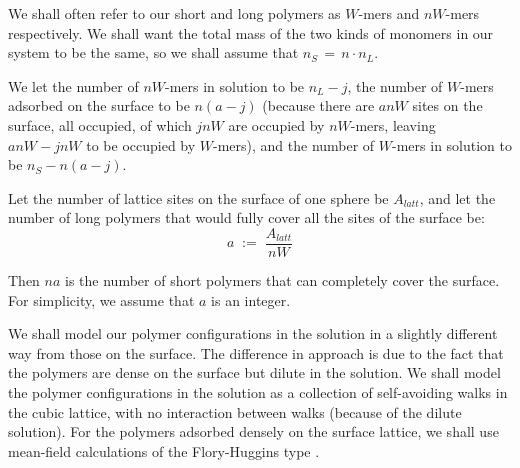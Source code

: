 \documentclass[journal=mamobx,manuscript=article]{achemso}
\begin{document}
We shall often refer to our short and long polymers as $W$-mers and $nW$-mers respectively.
We shall want the total mass of the two kinds of monomers in our system to be the same, so we 
shall assume that $n_S \,=\, n\cdot n_L$.

We let the number of $nW$-mers in solution to be $n_L-j$, the number of $W$-mers adsorbed on the surface to be $n(a-j)$ (because there are $anW$ sites on the surface, all occupied, of which $jnW$ are occupied by $nW$-mers, leaving $anW-jnW$ to be  occupied by $W$-mers), and the number of $W$-mers in solution to be  $n_S-n(a-j)$.



Let the number of lattice sites on the surface of one sphere be $A_{latt}$, and let the number of long polymers that would 
fully cover all the sites of the surface be:
\begin{equation}
    \label{eq.Number of Long Polymers that Fully Cover All Sites}
       a  \;:=\;  \frac{A_{latt}}{nW}
\end{equation}

Then $na$ is the number of short polymers that can completely cover the surface.
For simplicity, we assume that $a$ is an integer.



We shall model our polymer configurations in the solution in a slightly different way from those on the surface.
The difference in approach is due to the fact that the polymers are dense on the surface but 
dilute in the solution.  We shall model the polymer configurations in the solution as a collection of 
self-avoiding walks in the cubic lattice, with no interaction between walks (because of the dilute solution).
For the polymers adsorbed densely on the surface lattice, we shall use mean-field calculations 
of the Flory-Huggins type \cite{Flory1953}.
\end{document}

